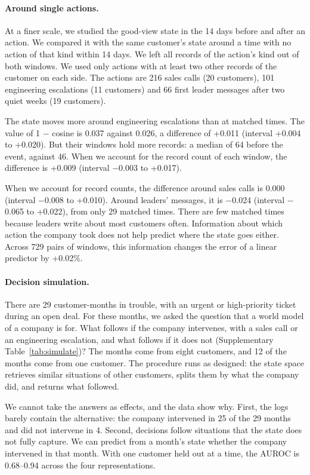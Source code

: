 \documentclass[11pt]{article}
\begin{document}
\paragraph{Around single actions.} At a finer scale, we studied the good-view state in the 14 days before and after an action. We compared it with the same customer's state around a time with no action of that kind within 14 days. We left all records of the action's kind out of both windows. We used only actions with at least two other records of the customer on each side. The actions are 216 sales calls (20 customers), 101 engineering escalations (11 customers) and 66 first leader messages after two quiet weeks (19 customers).

The state moves more around engineering escalations than at matched times. The value of 1 $-$ cosine is 0.037 against 0.026, a difference of +0.011 (interval +0.004 to +0.020). But their windows hold more records: a median of 64 before the event, against 46. When we account for the record count of each window, the difference is +0.009 (interval $-$0.003 to +0.017).

When we account for record counts, the difference around sales calls is 0.000 (interval $-$0.008 to +0.010). Around leaders' messages, it is $-$0.024 (interval $-$0.065 to +0.022), from only 29 matched times. There are few matched times because leaders write about most customers often. Information about which action the company took does not help predict where the state goes either. Across 729 pairs of windows, this information changes the error of a linear predictor by +0.02\%.

\paragraph{Decision simulation.} There are 29 customer-months in trouble, with an urgent or high-priority ticket during an open deal. For these months, we asked the question that a world model of a company is for. What follows if the company intervenes, with a sales call or an engineering escalation, and what follows if it does not (Supplementary Table~\ref{tab:simulate})? The months come from eight customers, and 12 of the months come from one customer. The procedure runs as designed: the state space retrieves similar situations of other customers, splits them by what the company did, and returns what followed.

We cannot take the answers as effects, and the data show why. First, the logs barely contain the alternative: the company intervened in 25 of the 29 months and did not intervene in 4. Second, decisions follow situations that the state does not fully capture. We can predict from a month's state whether the company intervened in that month. With one customer held out at a time, the AUROC is 0.68--0.94 across the four representations.
\end{document}
